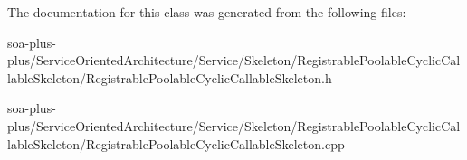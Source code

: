 The documentation for this class was generated from the following files:\begin{DoxyCompactItemize}
\item 
soa-\/plus-\/plus/ServiceOrientedArchitecture/Service/Skeleton/RegistrablePoolableCyclicCallableSkeleton/RegistrablePoolableCyclicCallableSkeleton.h\item 
soa-\/plus-\/plus/ServiceOrientedArchitecture/Service/Skeleton/RegistrablePoolableCyclicCallableSkeleton/RegistrablePoolableCyclicCallableSkeleton.cpp\end{DoxyCompactItemize}
